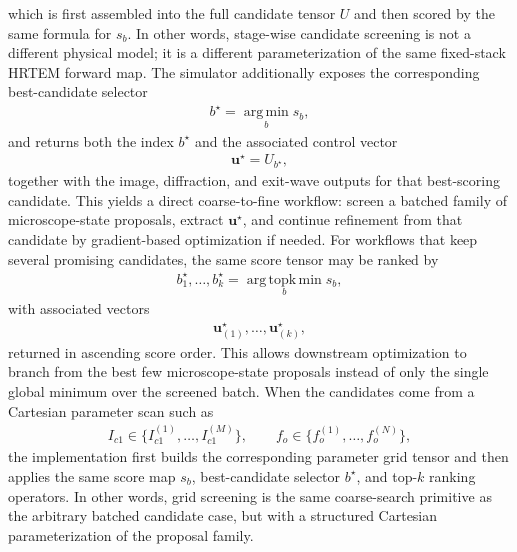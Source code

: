 \documentclass[11pt]{article}
\begin{document}
which is first assembled into the full candidate tensor $U$ and then scored by the
same formula for $s_b$.  In other words, stage-wise candidate screening is not a
different physical model; it is a different parameterization of the same fixed-stack
HRTEM forward map.
The simulator additionally exposes the corresponding best-candidate selector
\begin{align}
  b^\star = \operatorname*{arg\,min}_{b} s_b,
\end{align}
and returns both the index $b^\star$ and the associated control vector
\begin{align}
  \mathbf{u}^\star = U_{b^\star},
\end{align}
together with the image, diffraction, and exit-wave outputs for that best-scoring
candidate.  This yields a direct coarse-to-fine workflow: screen a batched family of
microscope-state proposals, extract $\mathbf{u}^\star$, and continue refinement from
that candidate by gradient-based optimization if needed.
For workflows that keep several promising candidates, the same score tensor may be
ranked by
\begin{align}
  b_1^\star, \dots, b_k^\star
  = \operatorname*{arg\,topk\,min}_{b} s_b,
\end{align}
with associated vectors
\begin{align}
  \mathbf{u}_{(1)}^\star, \dots, \mathbf{u}_{(k)}^\star,
\end{align}
returned in ascending score order.  This allows downstream optimization to branch from
the best few microscope-state proposals instead of only the single global minimum over
the screened batch.
When the candidates come from a Cartesian parameter scan such as
\begin{align}
  I_{c1} \in \{I_{c1}^{(1)}, \dots, I_{c1}^{(M)}\},
  \qquad
  f_o \in \{f_o^{(1)}, \dots, f_o^{(N)}\},
\end{align}
the implementation first builds the corresponding parameter grid tensor and then applies
the same score map $s_b$, best-candidate selector $b^\star$, and top-$k$ ranking
operators.  In other words, grid screening is the same coarse-search primitive as the
arbitrary batched candidate case, but with a structured Cartesian parameterization of
the proposal family.
\end{document}
